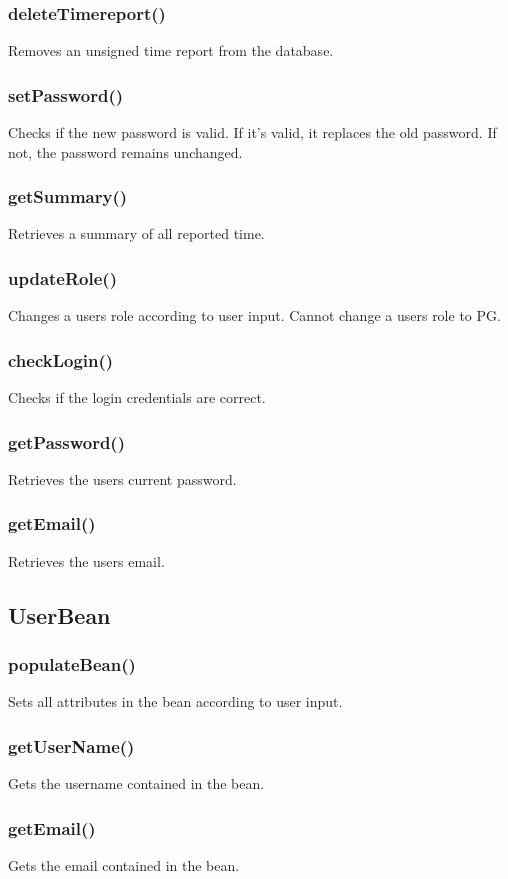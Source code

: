 \documentclass{article}
\begin{document}
\subsubsection{deleteTimereport()}
Removes an unsigned time report from the database. 
\subsubsection{setPassword()}
Checks if the new password is valid. If it's valid, it replaces the old password. If not, the password remains unchanged.
\subsubsection{getSummary()}
Retrieves a summary of all reported time.
\subsubsection{updateRole()}
Changes a users role according to user input. Cannot change a users role to PG.
\subsubsection{checkLogin()}
Checks if the login credentials are correct.
\subsubsection{getPassword()}
Retrieves the users current password.
\subsubsection{getEmail()}
Retrieves the users email.

\subsection{UserBean}
\subsubsection{populateBean()}
Sets all attributes in the bean according to user input.
\subsubsection{getUserName()}
Gets the username contained in the bean.
\subsubsection{getEmail()}
Gets the email contained in the bean.
\end{document}
